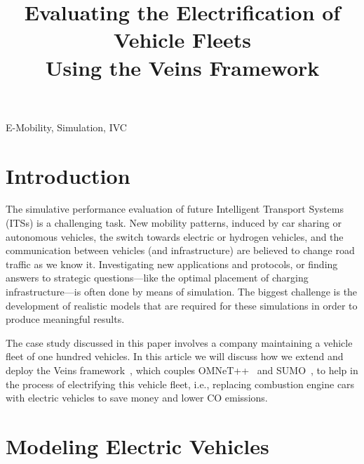 \documentclass[conference]{IEEEtran}
\begin{document}
\title{Evaluating the Electrification of Vehicle Fleets\\ Using the Veins Framework}


\author{
}








\maketitle

\begin{keywords}
E-Mobility, Simulation, IVC
\end{keywords}




\section{Introduction}

The simulative performance evaluation of future Intelligent
Transport Systems (ITSs) is a challenging task.
New mobility patterns, induced by car sharing or autonomous vehicles, the switch towards electric or hydrogen vehicles,
and the communication between vehicles (and infrastructure) are believed to change road traffic as we know it.
Investigating new applications and protocols, or finding answers to strategic questions---like the optimal placement of charging infrastructure---is often done by means of simulation.
The biggest challenge is the development of realistic models that are required for these simulations in order to produce meaningful results.

The case study discussed in this paper involves a company maintaining a vehicle fleet of one hundred vehicles.
In this article we will discuss how we extend and deploy the Veins framework~\cite{sommer2011bidirectionally}, which couples OMNeT++~\cite{varga2008overview} and SUMO~\cite{Krajzewicz2002}, to help in the process of electrifying this vehicle fleet, i.e., replacing combustion engine cars with electric vehicles to save money and lower CO emissions.


\section{Modeling Electric Vehicles}
\end{document}
